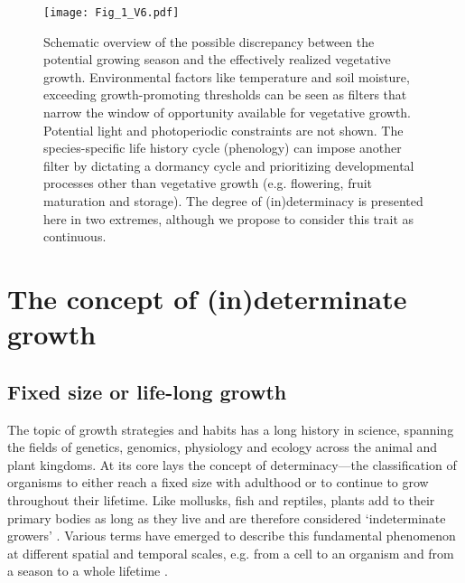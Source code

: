 \documentclass{article}
\begin{document}
		
								\begin{figure}
								\centering
								\texttt{[image: Fig\_1\_V6.pdf]} 
								\caption{Schematic overview of the possible discrepancy between the potential growing season and the effectively realized vegetative growth. Environmental factors like temperature and soil moisture, exceeding growth-promoting thresholds can be seen as filters that narrow the window of opportunity available for vegetative growth. Potential light and photoperiodic constraints are not shown. The species-specific life history cycle (phenology) can impose another filter by dictating a dormancy cycle and prioritizing developmental processes other than vegetative growth (e.g. flowering, fruit maturation and storage). The degree of (in)determinacy is presented here in two extremes, although we propose to consider this trait as continuous.}
								\label{fig:fig_1xxx}
							\end{figure}

	
\section*{The concept of (in)determinate growth}
	\subsection*{Fixed size or life-long growth} %
	The topic of growth strategies and habits has a long history in science, spanning the fields of genetics, genomics, physiology and ecology across the animal and plant kingdoms. At its core lays the concept of determinacy---the classification of organisms to either reach a fixed size with adulthood or to continue to grow throughout their lifetime. Like mollusks, fish and reptiles, plants add to their primary bodies as long as they live and are therefore considered `indeterminate growers' \citep{ejsmondHowTimeGrowth2010}. Various terms have emerged to describe this fundamental phenomenon at different spatial and temporal scales, e.g. from a cell to an organism and from a season to a whole lifetime \citep{mcdanielInductionDeterminationDevelopmental1992a, karkachTrajectoriesModelsIndividual2006}. \\
\end{document}
